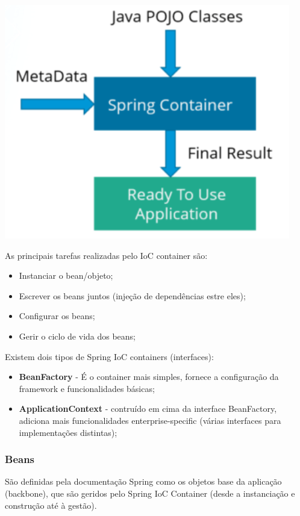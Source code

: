 \documentclass{article}
\begin{document}
\begin{center}
  \includegraphics[scale=0.4]{80}
\end{center}

As principais tarefas realizadas pelo IoC container são:
\begin{itemize} 
  \item Instanciar o bean/objeto;
  \item Escrever os beans juntos (injeção de dependências estre eles);
  \item Configurar os beans;
  \item Gerir o ciclo de vida dos beans;
\end{itemize}

Existem dois tipos de Spring IoC containers (interfaces):
\begin{itemize}
  \item \textbf{BeanFactory} - É o container mais simples, fornece
  a configuração da framework e funcionalidades básicas;
  \item \textbf{ApplicationContext} - contruído em cima da interface
  BeanFactory, adiciona mais funcionalidades enterprise-specific (várias
  interfaces para implementações distintas);
\end{itemize}

\pagebreak

\subsubsection{Beans}

São definidas pela documentação Spring como os objetos base da aplicação (backbone), que são geridos
pelo Spring IoC Container (desde a instanciação e construção até à gestão).
\end{document}

